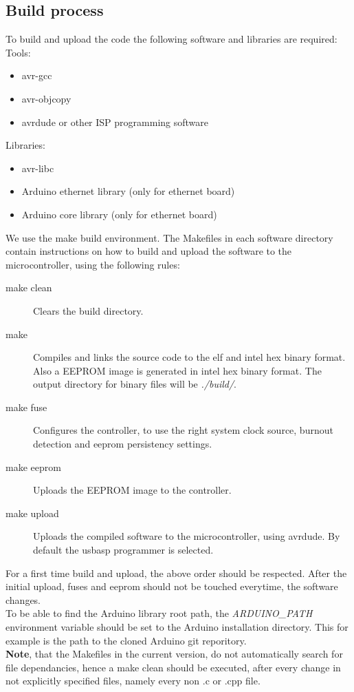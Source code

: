 \documentclass[a4paper]{scrreprt}
\begin{document}
\subsection{Build process}
To build and upload the code the following software and libraries are required:\\
Tools:
\begin{itemize}
  \item avr-gcc
  \item avr-objcopy
  \item avrdude or other ISP programming software
\end{itemize}
Libraries:
\begin{itemize}
  \item avr-libc
  \item Arduino ethernet library (only for ethernet board)
  \item Arduino core library (only for ethernet board)
\end{itemize}
We use the make build environment. The Makefiles in each software directory contain instructions on how to build and upload the software to the microcontroller, using the following rules:
\begin{description}
  \item[make clean] Clears the build directory.
  \item[make] Compiles and links the source code to the elf and intel hex binary format. Also a EEPROM image is generated in intel hex binary format. The output directory for binary files will be \emph{./build/}.
  \item[make fuse] Configures the controller, to use the right system clock source, burnout detection and eeprom persistency settings.
  \item[make eeprom] Uploads the EEPROM image to the controller.
  \item[make upload] Uploads the compiled software to the microcontroller, using avrdude. By default the usbasp programmer is selected.
\end{description}
For a first time build and upload, the above order should be respected. After the initial upload, fuses and eeprom should not be touched everytime, the software changes.\\
To be able to find the Arduino library root path, the \emph{ARDUINO\_PATH} environment variable should be set to the Arduino installation directory. This for example is the path to the cloned Arduino git reporitory.\\
\textbf{Note}, that the Makefiles in the current version, do not automatically search for file dependancies, hence a make clean should be executed, after every change in not explicitly specified files, namely every non .c or .cpp file.
\end{document}
